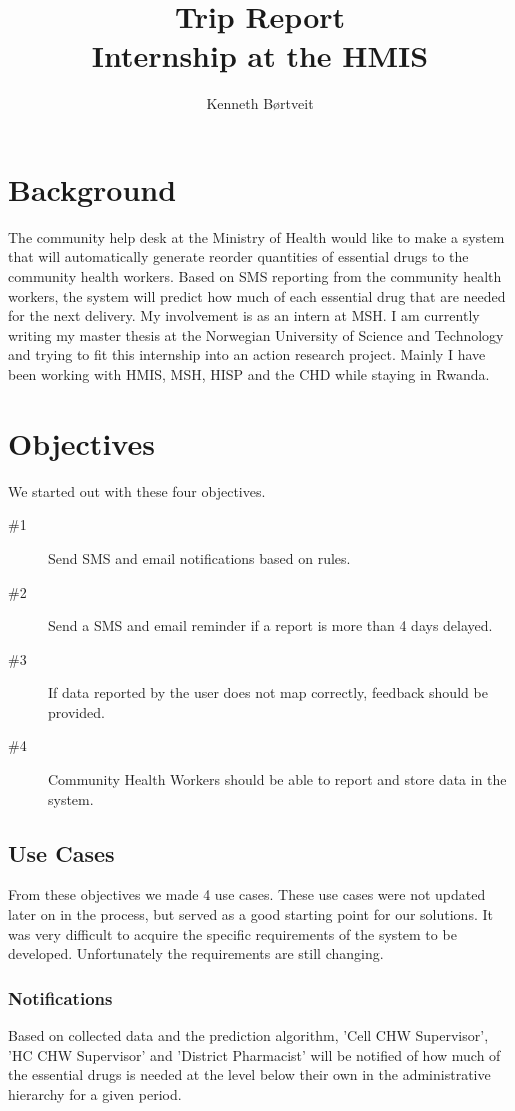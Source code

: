 \documentclass[a4paper]{report}
\title{Trip Report \\ Internship at the HMIS}
\author{Kenneth Børtveit}
\begin{document}
\maketitle

\chapter{Background}
The community help desk at the Ministry of Health would like to make a system that will automatically generate reorder quantities of essential drugs to the community health workers.
Based on SMS reporting from the community health workers, the system will predict how much of each essential drug that are needed for the next delivery. My involvement is as an intern at MSH. I am currently writing my master thesis at the Norwegian University of Science and Technology and trying to fit this internship into an action research project. Mainly I have been working with HMIS, MSH, HISP and the CHD while staying in Rwanda.

\chapter{Objectives}
We started out with these four objectives.
\begin{description}
\item[\#1] Send SMS and email notifications based on rules.
\item[\#2] Send a SMS and email reminder if a report is more than 4 days delayed.
\item[\#3] If data reported by the user does not map correctly, feedback should be provided.
\item[\#4] Community Health Workers should be able to report and store data in the system.
\end{description}

\section{Use Cases}
From these objectives we made 4 use cases. These use cases were not updated later on in the process, but served as a good starting point for our solutions. It was very difficult to acquire the specific requirements of the system to be developed. Unfortunately the requirements are still changing.

\pagebreak

\subsection{Notifications}
Based on collected data and the prediction algorithm, 'Cell CHW Supervisor', 'HC CHW Supervisor' and 'District Pharmacist' will be notified of how much of the essential drugs is needed at the level below their own in the administrative hierarchy for a given period. 
\end{document}
